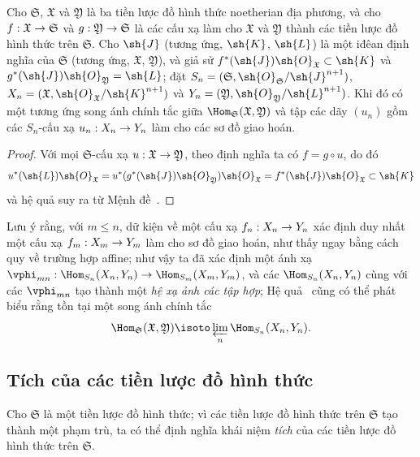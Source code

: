 \documentclass[oneside]{amsart}
\makeatletter
\renewcommand{\leq}{\leqslant}
\newcommand{\ega@arrow}[2]{\mathchoice{#1}{#2}{#2}{#2}}
\renewcommand{\to}{\ega@arrow{\longrightarrow}{\rightarrow}}
\newcommand{\oldpage}[2][]{{\marginnote{\normalfont\textbf{#1}~|~#2}}\ignorespaces}
\let\EGAOriginalLabel\label
\renewcommand{\label}[1]{\phantomsection\EGAOriginalLabel{#1}}
\makeatother
\begin{document}
\begin{corollary}[10.6.11]
\label{I.10.6.11}
Cho $\mathfrak{S}$, $\mathfrak{X}$ và $\mathfrak{Y}$ là ba tiền lược đồ hình thức noetherian địa phương, và cho $f:\mathfrak{X}\to\mathfrak{S}$ và $g:\mathfrak{Y}\to\mathfrak{S}$ là các cấu xạ làm cho $\mathfrak{X}$ và $\mathfrak{Y}$ thành các tiền lược đồ hình thức trên $\mathfrak{S}$.
Cho $\sh{J}$ (tương ứng, $\sh{K}$, $\sh{L}$) là một iđêan định nghĩa của $\mathfrak{S}$ (tương ứng, $\mathfrak{X}$, $\mathfrak{Y}$), và giả sử $f^*(\sh{J})\sh{O}_\mathfrak{X}\subset\sh{K}$ và $g^*(\sh{J})\sh{O}_\mathfrak{Y}=\sh{L}$; đặt $S_n=(\mathfrak{S},\sh{O}_\mathfrak{S}/\sh{J}^{n+1})$, $X_n=(\mathfrak{X},\sh{O}_\mathfrak{X}/\sh{K}^{n+1})$ và $Y_n=(\mathfrak{Y},\sh{O}_\mathfrak{Y}/\sh{L}^{n+1})$.
Khi đó có một tương ứng song ánh chính tắc
\oldpage[I]{193}
giữa $\Hom_\mathfrak{S}(\mathfrak{X},\mathfrak{Y})$ và tập các dãy $(u_n)$ gồm các $S_n$-cấu xạ $u_n:X_n\to Y_n$ làm cho các sơ đồ  giao hoán.
\end{corollary}

\begin{proof}
Với mọi $\mathfrak{S}$-cấu xạ $u:\mathfrak{X}\to\mathfrak{Y}$, theo định nghĩa ta có $f=g\circ u$, do đó
\[
  u^*(\sh{L})\sh{O}_\mathfrak{X}=u^*(g^*(\sh{J})\sh{O}_\mathfrak{Y})\sh{O}_\mathfrak{X}=f^*(\sh{J})\sh{O}_\mathfrak{X}\subset\sh{K}
\]
và hệ quả suy ra từ Mệnh đề~.
\end{proof}

Lưu ý rằng, với $m\leq n$, dữ kiện về một cấu xạ $f_n:X_n\to Y_n$ xác định duy nhất một cấu xạ $f_m:X_m\to Y_m$ làm cho sơ đồ  giao hoán, như thấy ngay bằng cách quy về trường hợp affine; như vậy ta đã xác định một ánh xạ $\vphi_{mn}:\Hom_{S_n}(X_n,Y_n)\to\Hom_{S_m}(X_m,Y_m)$, và các $\Hom_{S_n}(X_n,Y_n)$ cùng với các $\vphi_{mn}$ tạo thành một \emph{hệ xạ ảnh các tập hợp}; Hệ quả~ cũng có thể phát biểu rằng tồn tại một song ánh chính tắc
\[
  \Hom_\mathfrak{S}(\mathfrak{X},\mathfrak{Y})\isoto\varprojlim_n\Hom_{S_n}(X_n,Y_n).
\]

\subsection{Tích của các tiền lược đồ hình thức}
\label{subsection:I.10.7}

\begin{env}[10.7.1]
\label{I.10.7.1}
Cho $\mathfrak{S}$ là một tiền lược đồ hình thức; vì các tiền lược đồ hình thức trên $\mathfrak{S}$ tạo thành một phạm trù, ta có thể định nghĩa khái niệm \emph{tích} của các tiền lược đồ hình thức trên $\mathfrak{S}$.
\end{env}
\end{document}
